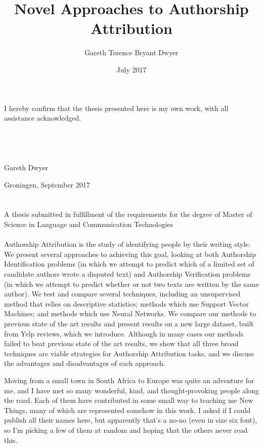 \documentclass[12pt] {newrucsthesis}    %
\begin{document}
   
\title{ Novel Approaches to Authorship Attribution}
\author{ Gareth Terence Bryant Dwyer }
\date { July 2017 }
\maketitle  

\acm
I hereby confirm that the thesis presented here is my own work, with all assistance acknowledged.
\\
\\
\\
\\
\\
Gareth Dwyer

Groningen, September 2017
\\
\\
\\
A thesis submitted in fulfillment of the requirements for the degree of Master of Science in Language and Communication Technologies
\\
\\




\abstract
Authorship Attribution is the study of identifying people by their writing style. We present several approaches to achieving this goal, looking at both Authorship Identification problems (in which we attempt to predict which of a limited set of candidate authors wrote a disputed text) and Authorship Verification problems (in which we attempt to predict whether or not two texts are written by the same author). We test and compare several techniques, including an unsupervised method that relies on descriptive statistics; methods which use Support Vector Machines; and methods which use Neural Networks. We compare our methods to previous state of the art results and present results on a new large dataset, built from Yelp reviews, which we introduce. Although in many cases our methods failed to beat previous state of the art results, we show that all three broad techniques are viable strategies for Authorship Attribution tasks, and we discuss the advantages and disadvantages of each approach.

\ack
Moving from a small town in South Africa to Europe was quite an adventure for me, and I have met so many wonderful, kind, and thought-provoking people along the road. Each of them have contributed in some small way to teaching me New Things, many of which are represented somehow in this work. I asked if I could publish all their names here, but apparently that's a no-no (even in size six font), so I'm picking a few of them at random and hoping that the others never read this.
\end{document}
